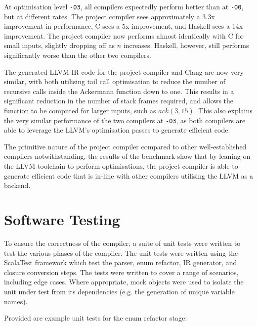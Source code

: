 At optimisation level \texttt{-O3}, all compilers expectedly perform better than at \texttt{-O0},
but at different rates. The project compiler sees approximately a 3.3x improvement in performance, C
sees a 5x improvement, and Haskell sees a 14x improvement. The project compiler now performs almost
identically with C for small inputs, slightly dropping off as $n$ increases. Haskell, however, still
performs significantly worse than the other two compilers.

The generated LLVM IR code for the project compiler and Clang are now very similar, with both
utilising tail call optimisation to reduce the number of recursive calls inside the Ackermann
function down to one. This results in a significant reduction in the number of stack frames
required, and allows the function to be computed for larger inputs, such as $ack(3,15)$. This also
explains the very similar performance of the two compilers at \texttt{-O3}, as both compilers are
able to leverage the LLVM's optimisation passes to generate efficient code.

The primitive nature of the project compiler compared to other well-established compilers
notwithstanding, the results of the benchmark show that by leaning on the LLVM toolchain to perform
optimisations, the project compiler is able to generate efficient code that is in-line with other
compilers utilising the LLVM as a backend.

\section{Software Testing}

To ensure the correctness of the compiler, a suite of unit tests were written to test the various
phases of the compiler. The unit tests were written using the ScalaTest framework which test the
parser, enum refactor, IR generator, and closure conversion steps. The tests were written to cover a
range of scenarios, including edge cases. Where appropriate, mock objects were used to isolate the
unit under test from its dependencies (e.g. the generation of unique variable names).

Provided are example unit tests for the enum refactor stage:

